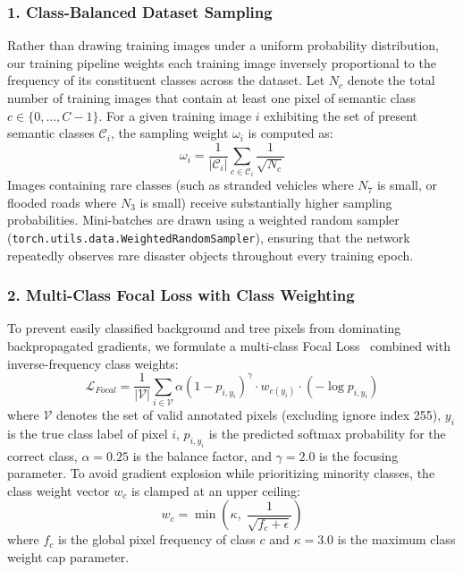 \subsubsection{1. Class-Balanced Dataset Sampling}
Rather than drawing training images under a uniform probability distribution, our training pipeline weights each training image inversely proportional to the frequency of its constituent classes across the dataset. Let $N_c$ denote the total number of training images that contain at least one pixel of semantic class $c \in \{0, \dots, C-1\}$. For a given training image $i$ exhibiting the set of present semantic classes $\mathcal{C}_i$, the sampling weight $\omega_i$ is computed as:
\begin{equation}
    \omega_i = \frac{1}{|\mathcal{C}_i|} \sum_{c \in \mathcal{C}_i} \frac{1}{\sqrt{N_c}}
\end{equation}
Images containing rare classes (such as stranded vehicles where $N_7$ is small, or flooded roads where $N_3$ is small) receive substantially higher sampling probabilities. Mini-batches are drawn using a weighted random sampler (\texttt{torch.utils.data.WeightedRandomSampler}), ensuring that the network repeatedly observes rare disaster objects throughout every training epoch.

\subsubsection{2. Multi-Class Focal Loss with Class Weighting}
To prevent easily classified background and tree pixels from dominating backpropagated gradients, we formulate a multi-class Focal Loss~\cite{lin2017focal} combined with inverse-frequency class weights:
\begin{equation}
    \mathcal{L}_{Focal} = \frac{1}{|\mathcal{V}|} \sum_{i \in \mathcal{V}} \alpha \left(1 - p_{i, y_i}\right)^\gamma \cdot w_{c(y_i)} \cdot \left(-\log p_{i, y_i}\right)
\end{equation}
where $\mathcal{V}$ denotes the set of valid annotated pixels (excluding ignore index 255), $y_i$ is the true class label of pixel $i$, $p_{i, y_i}$ is the predicted softmax probability for the correct class, $\alpha = 0.25$ is the balance factor, and $\gamma = 2.0$ is the focusing parameter. To avoid gradient explosion while prioritizing minority classes, the class weight vector $w_c$ is clamped at an upper ceiling:
\begin{equation}
    w_c = \min\left(\kappa, \; \frac{1}{\sqrt{f_c + \epsilon}}\right)
\end{equation}
where $f_c$ is the global pixel frequency of class $c$ and $\kappa = 3.0$ is the maximum class weight cap parameter.

